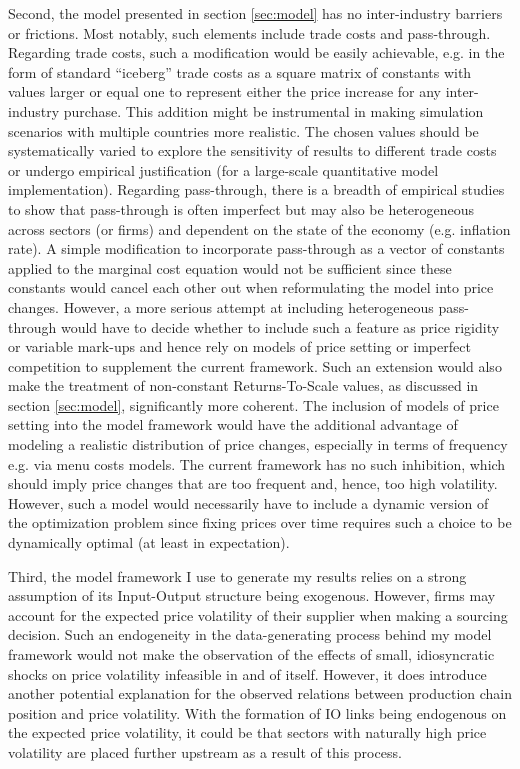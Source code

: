 Second, the model presented in section \ref{sec:model} has no inter-industry barriers or frictions. Most notably, 
such elements include trade costs and pass-through. Regarding trade costs, such a modification would be easily achievable, e.g. in the 
form of standard ``iceberg'' trade costs as a square matrix of constants with values larger or equal one to represent either the price increase 
for any inter-industry purchase. This addition might be instrumental in making simulation scenarios with multiple countries more 
realistic. The chosen values should be systematically varied to explore the sensitivity of results to different trade costs or 
undergo empirical justification (for a large-scale quantitative model implementation). Regarding pass-through, there is a breadth of empirical 
studies to show that pass-through is often imperfect but may also be heterogeneous across sectors (or firms) and dependent on the state of the 
economy (e.g. inflation rate). A simple modification to incorporate pass-through as a vector of constants applied to the marginal cost 
equation would not be sufficient since these constants would cancel each other out when reformulating the model into price changes.
However, a more serious attempt at including heterogeneous pass-through would have to decide whether to include such a feature as 
price rigidity or variable mark-ups and hence rely on models of price setting or imperfect competition to supplement the current framework.
Such an extension would also make the treatment of non-constant Returns-To-Scale values, as discussed in section \ref{sec:model}, significantly
more coherent. The inclusion of models of price setting into the model framework would have the additional advantage of modeling a realistic
distribution of price changes, especially in terms of frequency e.g. via menu costs models. The current framework has no such inhibition,
which should imply price changes that are too frequent and, hence, too high volatility. However, such a model would necessarily 
have to include a dynamic version of the optimization problem since fixing prices over time requires such a choice to be dynamically optimal 
(at least in expectation).

Third, the model framework I use to generate my results relies on a strong assumption of its Input-Output structure being exogenous.
However, firms may account for the expected price volatility of their supplier when making a sourcing decision.
Such an endogeneity in the data-generating process behind my model framework would not make the observation of the effects of
small, idiosyncratic shocks on price volatility infeasible in and of itself. However, it does introduce another potential explanation 
for the observed relations between production chain position and price volatility. With the formation of IO links being endogenous on 
the expected price volatility, it could be that sectors with naturally high price volatility are placed further upstream as a result 
of this process.

